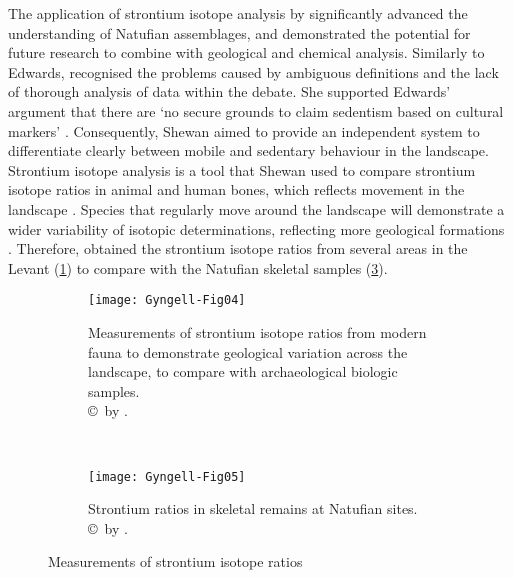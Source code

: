 The application of strontium isotope analysis by \textcite{Shewan_2004} significantly advanced the understanding of Natufian assemblages, and demonstrated the potential for future research to combine with geological and chemical analysis.
Similarly to Edwards, \textcite[55]{Shewan_2004} recognised the problems caused by ambiguous definitions and the lack of thorough analysis of data within the debate. 
She supported Edwards’ argument that there are ‘no secure grounds to claim sedentism based on cultural markers’ \parencite[57]{Shewan_2004}. Consequently, Shewan aimed to provide an independent system to differentiate clearly between mobile and sedentary behaviour in the landscape. 
Strontium isotope analysis is a tool that Shewan used to compare strontium isotope ratios in animal and human bones, which reflects movement in the landscape \parencite[59]{Shewan_2004}. 
Species that regularly move around the landscape will demonstrate a wider variability of isotopic determinations, reflecting more geological formations \parencite[61]{Shewan_2004}. 
Therefore, \textcite[62]{Shewan_2004} obtained the strontium isotope ratios from several areas in the Levant (\cref{fig:Gyngell-Fig04}) to compare with the Natufian skeletal samples (\cref{fig:Gyngell-Fig05}). 

\begin{figure}[!b]
        \begin{subfigure}[t]{0.65\textwidth}
	\texttt{[image: Gyngell-Fig04]}
\caption{Measurements of strontium isotope ratios from modern fauna to demonstrate geological variation across the landscape, to compare with archaeological biologic samples.
        {\normalfont\scriptsize \\ \copyright\ by \textcite{Shewan_2004}.}}
\label{fig:Gyngell-Fig04}%
\end{subfigure}~
\hspace*{1em}~\begin{subfigure}[t]{0.65\textwidth}
	\texttt{[image: Gyngell-Fig05]}
	
\caption{Strontium ratios in skeletal remains at Natufian sites.
        {\normalfont\scriptsize \\ \copyright\ by \textcite{Shewan_2004}.}}
\label{fig:Gyngell-Fig05}
\end{subfigure}
\caption{Measurements of strontium isotope ratios}
\end{figure}

